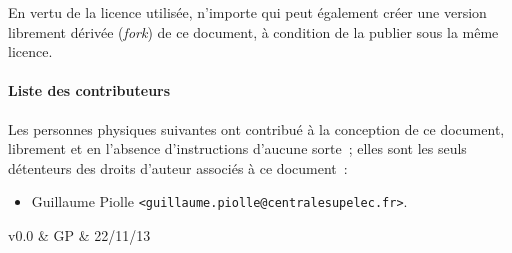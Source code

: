 {  En vertu de la licence utilisée, n'importe qui peut également créer
  une version librement dérivée (\textit{fork}) de ce document, à
  condition de la publier sous la même licence.

  \paragraph*{Liste des contributeurs}
  Les personnes physiques suivantes ont contribué à la conception de
  ce document, librement et en l'absence d'instructions d'aucune
  sorte~; elles sont les seuls détenteurs des droits d'auteur
  associés à ce document~:
  \begin{itemize}
  \item Guillaume Piolle \texttt{<guillaume.piolle@centralesupelec.fr>}.
  \end{itemize}

  \begin{versions}
    v0.0 & GP & 22/11/13
  \end{versions}
}